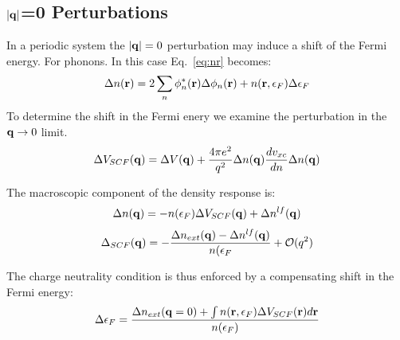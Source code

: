 \subsection{$|{\bf q}|$=0 Perturbations}
In a periodic system the $|{\bf q}|=0$ perturbation may induce a shift of the Fermi
energy. For phonons. In this case Eq.~\ref{eq:nr} becomes:
%
\begin{equation}
\Delta n({\bf r}) = 2 \sum_{n} \phi_{n}^{*}({\bf r})\Delta\phi_{n}({\bf r}) + n({\bf r},\epsilon_{F})\Delta\epsilon_{F}
\end{equation}
%
To determine the shift in the Fermi enery we examine the perturbation in the ${\bf q} \rightarrow 0$ limit.
%
\begin{equation}
\Delta V_{SCF}({\bf q}) = \Delta V({\bf q}) + \frac{4\pi e^{2}}{q^{2}}\Delta n({\bf q}) \frac{dv_{xc}}{dn}\Delta n({\bf q})
\end{equation}

The macroscopic component of the density response is:
%
\begin{equation}
\Delta n({\bf q}) = -n(\epsilon_{F}) \Delta V_{SCF}({\bf q}) + \Delta n^{lf}({\bf q})
\end{equation}
%
\begin{equation}
\Delta_{SCF}({\bf q}) = -\frac{\Delta n_{ext}({\bf q}) -\Delta n^{lf}({\bf q})}{n(\epsilon_{F}} + \mathcal{O}(q^{2})
\end{equation}

The charge neutrality condition is thus enforced
by a compensating shift in the Fermi energy:
%
\begin{equation}
\Delta \epsilon_{F}=\frac{\Delta n_{ext}({\bf q}=0)+\int n({\bf r},\epsilon_{F})\Delta V_{SCF}({\bf r})d{\bf r}}{n(\epsilon_{F})}
\end{equation}

